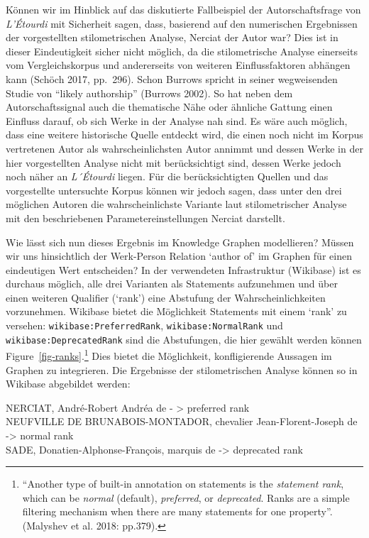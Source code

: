 \documentclass[
  12pt,
  letterpaper,
  DIV=11,
  numbers=noendperiod]{scrreprt}
\begin{document}
Können wir im Hinblick auf das diskutierte Fallbeispiel der
Autorschaftsfrage von \emph{L'Étourdi} mit Sicherheit sagen, dass,
basierend auf den numerischen Ergebnissen der vorgestellten
stilometrischen Analyse, Nerciat der Autor war? Dies ist in dieser
Eindeutigkeit sicher nicht möglich, da die stilometrische Analyse
einerseits vom Vergleichskorpus und andererseits von weiteren
Einflussfaktoren abhängen kann (Schöch 2017, pp.~296). Schon Burrows
spricht in seiner wegweisenden Studie von ``likely authorship'' (Burrows
2002). So hat neben dem Autorschaftssignal auch die thematische Nähe
oder ähnliche Gattung einen Einfluss darauf, ob sich Werke in der
Analyse nah sind. Es wäre auch möglich, dass eine weitere historische
Quelle entdeckt wird, die einen noch nicht im Korpus vertretenen Autor
als wahrscheinlichsten Autor annimmt und dessen Werke in der hier
vorgestellten Analyse nicht mit berücksichtigt sind, dessen Werke jedoch
noch näher an \emph{L´Étourdi} liegen. Für die berücksichtigten Quellen
und das vorgestellte untersuchte Korpus können wir jedoch sagen, dass
unter den drei möglichen Autoren die wahrscheinlichste Variante laut
stilometrischer Analyse mit den beschriebenen Parametereinstellungen
Nerciat darstellt.

Wie lässt sich nun dieses Ergebnis im Knowledge Graphen modellieren?
Müssen wir uns hinsichtlich der Werk-Person Relation `author of' im
Graphen für einen eindeutigen Wert entscheiden? In der verwendeten
Infrastruktur (Wikibase) ist es durchaus möglich, alle drei Varianten
als Statements aufzunehmen und über einen weiteren Qualifier (`rank')
eine Abstufung der Wahrscheinlichkeiten vorzunehmen. Wikibase bietet die
Möglichkeit Statements mit einem `rank' zu versehen:
\texttt{wikibase:PreferredRank}, \texttt{wikibase:NormalRank} und
\texttt{wikibase:DeprecatedRank} sind die Abstufungen, die hier gewählt
werden können Figure~\ref{fig-ranks}.\footnote{``Another type of
  built-in annotation on statements is the \emph{statement rank}, which
  can be \emph{normal} (default), \emph{preferred}, or
  \emph{deprecated}. Ranks are a simple filtering mechanism when there
  are many statements for one property''. (Malyshev et al. 2018:
  pp.379).} Dies bietet die Möglichkeit, konfligierende Aussagen im
Graphen zu integrieren. Die Ergebnisse der stilometrischen Analyse
können so in Wikibase abgebildet werden:

NERCIAT, André-Robert Andréa de - \textgreater{} preferred rank\\
NEUFVILLE DE BRUNABOIS-MONTADOR, chevalier Jean-Florent-Joseph de
-\textgreater{} normal rank\\
SADE, Donatien-Alphonse-François, marquis de -\textgreater{} deprecated
rank
\end{document}
